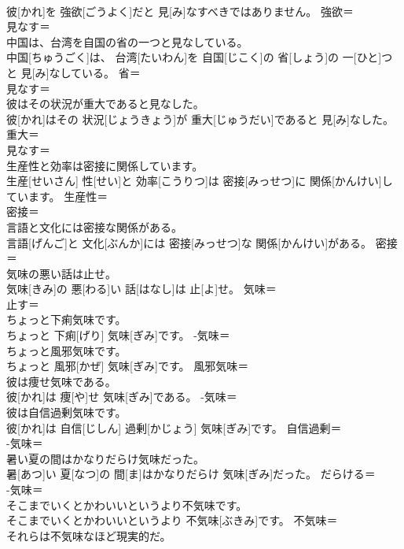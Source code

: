 \documentclass[8pt]{extreport}
\begin{document}
\begin{CJK}{UTF8}{min}
\\	彼[かれ]を 強欲[ごうよく]だと 見[み]なすべきではありません。	強欲＝ 
\\	見なす＝ 
\\	中国は、台湾を自国の省の一つと見なしている。	
\\	中国[ちゅうごく]は、 台湾[たいわん]を 自国[じこく]の 省[しょう]の 一[ひと]つと 見[み]なしている。	省＝ 
\\	見なす＝ 
\\	彼はその状況が重大であると見なした。	
\\	彼[かれ]はその 状況[じょうきょう]が 重大[じゅうだい]であると 見[み]なした。	重大＝ 
\\	見なす＝ 
\\	生産性と効率は密接に関係しています。	
\\	生産[せいさん] 性[せい]と 効率[こうりつ]は 密接[みっせつ]に 関係[かんけい]しています。	生産性＝ 
\\	密接＝ 
\\	言語と文化には密接な関係がある。	
\\	言語[げんご]と 文化[ぶんか]には 密接[みっせつ]な 関係[かんけい]がある。	密接＝ 
\\	気味の悪い話は止せ。	
\\	気味[きみ]の 悪[わる]い 話[はなし]は 止[よ]せ。	気味＝ 
\\	止す＝ 
\\	ちょっと下痢気味です。	
\\	ちょっと 下痢[げり] 気味[ぎみ]です。	-気味＝ 
\\	ちょっと風邪気味です。	
\\	ちょっと 風邪[かぜ] 気味[ぎみ]です。	風邪気味＝ 
\\	彼は痩せ気味である。	
\\	彼[かれ]は 痩[や]せ 気味[ぎみ]である。	-気味＝ 
\\	彼は自信過剰気味です。	
\\	彼[かれ]は 自信[じしん] 過剰[かじょう] 気味[ぎみ]です。	自信過剰＝ 
\\	-気味＝ 
\\	暑い夏の間はかなりだらけ気味だった。	
\\	暑[あつ]い 夏[なつ]の 間[ま]はかなりだらけ 気味[ぎみ]だった。	だらける＝ 
\\	-気味＝ 
\\	そこまでいくとかわいいというより不気味です。	
\\	そこまでいくとかわいいというより 不気味[ぶきみ]です。	不気味＝ 
\\	それらは不気味なほど現実的だ。	

\end{CJK}
\end{document}

